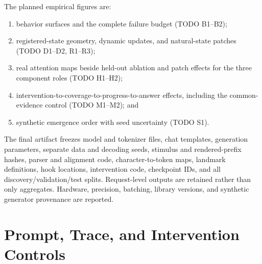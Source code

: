 The planned empirical figures are:
\begin{enumerate}
  \item behavior surfaces and the complete failure budget (TODO B1--B2);
  \item registered-state geometry, dynamic updates, and natural-state patches
  (TODO D1--D2, R1--R3);
  \item real attention maps beside held-out ablation and patch effects for the
  three component roles (TODO H1--H2);
  \item intervention-to-coverage-to-progress-to-answer effects, including the
  common-evidence control (TODO M1--M2); and
  \item synthetic emergence order with seed uncertainty (TODO S1).
\end{enumerate}

The final artifact freezes model and tokenizer files, chat templates,
generation parameters, separate data and decoding seeds, stimulus and
rendered-prefix hashes, parser and alignment code, character-to-token maps,
landmark definitions, hook locations, intervention code, checkpoint IDs, and
all discovery/validation/test splits. Request-level outputs are retained
rather than only aggregates. Hardware, precision, batching, library versions,
and synthetic generator provenance are reported.

\section{Prompt, Trace, and Intervention Controls}
\label{app:controls}

